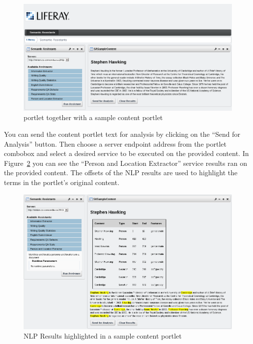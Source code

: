 \begin{figure}
\centering
\includegraphics[scale=0.6]{pictures/liferay_both_portlets.png}
\caption{\sa portlet together with a sample content portlet}
\label{fig:liferay_both_portlets}
\end{figure}

You can send the content portlet text for analysis by clicking on the ``Send for Analysis'' button. Then choose a server endpoint address from the \sa portlet combobox and select a desired service to be executed on the provided content. In Figure~\ref{fig:liferay_results_portlet} you can see the ``Person and Location Extractor'' service results ran on the provided content. The offsets of the NLP results are used to highlight the terms in the portlet's original content.

\begin{figure}
\centering
\includegraphics[scale=0.6]{pictures/liferay_results_portlet.png}
\caption{NLP Results highlighted in a sample content portlet}
\label{fig:liferay_results_portlet}
\end{figure}

